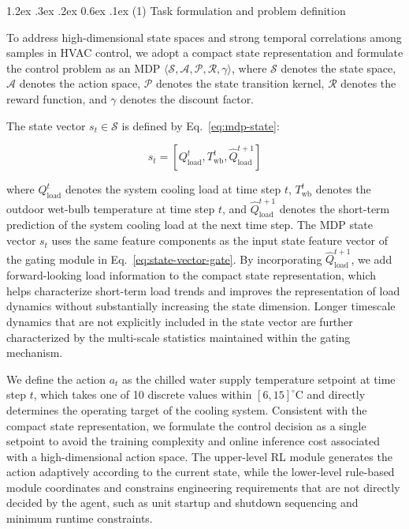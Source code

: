 \documentclass[preprint,12pt]{elsarticle}
\makeatletter
\renewcommand\paragraph{\@startsection{paragraph}{4}{\z@}%
  {1.2ex \@plus .3ex \@minus .2ex}%
  {0.6ex \@plus .1ex}%
  {\normalfont\normalsize}}
\makeatother
\begin{document}
\paragraph{(1) Task formulation and problem definition}\label{task-formulation-and-problem-definition}

To address high-dimensional state spaces and strong temporal correlations among samples in HVAC control, we adopt a compact state representation and formulate the control problem as an MDP \(\langle \mathcal{S}, \mathcal{A}, \mathcal{P}, \mathcal{R}, \gamma \rangle\), where \(\mathcal{S}\) denotes the state space, \(\mathcal{A}\) denotes the action space, \(\mathcal{P}\) denotes the state transition kernel, \(\mathcal{R}\) denotes the reward function, and \(\gamma\) denotes the discount factor.

The state vector \(s_t \in \mathcal{S}\) is defined by Eq.~\eqref{eq:mdp-state}:

\[s_t = [Q_{\mathrm{load}}^t, T_{\mathrm{wb}}^t, \hat{Q}_{\mathrm{load}}^{t+1}] \tag{17}\label{eq:mdp-state}\]

\noindent where \(Q_{\mathrm{load}}^t\) denotes the system cooling load at time step \(t\), \(T_{\mathrm{wb}}^t\) denotes the outdoor wet-bulb temperature at time step \(t\), and \(\hat{Q}_{\mathrm{load}}^{t+1}\) denotes the short-term prediction of the system cooling load at the next time step. The MDP state vector \(s_t\) uses the same feature components as the input state feature vector of the gating module in Eq.~\eqref{eq:state-vector-gate}. By incorporating \(\hat{Q}_{\mathrm{load}}^{t+1}\), we add forward-looking load information to the compact state representation, which helps characterize short-term load trends and improves the representation of load dynamics without substantially increasing the state dimension. Longer timescale dynamics that are not explicitly included in the state vector are further characterized by the multi-scale statistics maintained within the gating mechanism.

We define the action \(a_t\) as the chilled water supply temperature setpoint at time step \(t\), which takes one of 10 discrete values within \([6,15]^{\circ}\mathrm{C}\) and directly determines the operating target of the cooling system. Consistent with the compact state representation, we formulate the control decision as a single setpoint to avoid the training complexity and online inference cost associated with a high-dimensional action space. The upper-level RL module generates the action adaptively according to the current state, while the lower-level rule-based module coordinates and constrains engineering requirements that are not directly decided by the agent, such as unit startup and shutdown sequencing and minimum runtime constraints.
\end{document}
